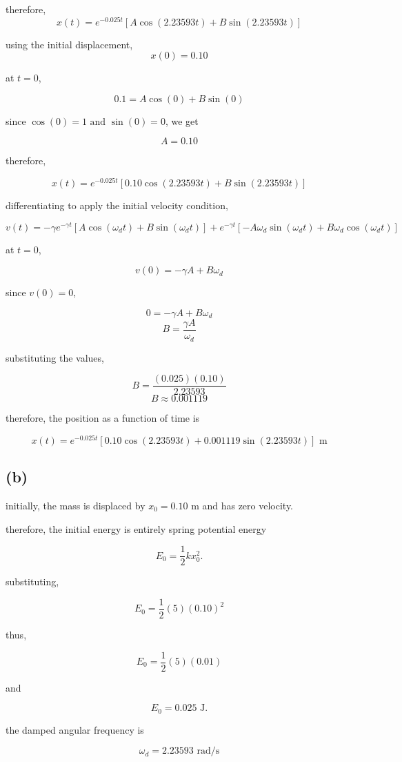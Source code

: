\documentclass{article}
\begin{document}
therefore,
\[
x(t)=e^{-0.025t}\left[A\cos(2.23593t)+B\sin(2.23593t)\right]
\]

using the initial displacement,
\[
x(0)=0.10
\]

at $t=0$,

\[
0.1=A\cos(0)+B\sin(0)
\]

since $\cos(0)=1 \text{ and } \sin(0)=0$, we get

\[
A=0.10
\]

therefore,

\[
x(t) = e^{-0.025t}\left[0.10\cos(2.23593t)+B\sin(2.23593t)\right]
\]

differentiating to apply the initial velocity condition,

\[
v(t)=-\gamma e^{-\gamma t}\left[A\cos(\omega_dt)+B\sin(\omega_dt)\right]+e^{-\gamma t}\left[-A\omega_d\sin(\omega_dt)+B\omega_d\cos(\omega_dt)\right]
\]

at $t=0$,

\[
v(0)=-\gamma A+B\omega_d
\]

since $v(0)=0$,

\[
0=-\gamma A+B\omega_d
\]
\[
B=\frac{\gamma A}{\omega_d}
\]

substituting the values,

\[
B=\frac{(0.025)(0.10)}{2.23593}
\]
\[
B\approx0.001119
\]

therefore, the position as a function of time is

\[
\boxed{
x(t)=e^{-0.025t}\left[0.10\cos(2.23593t)+0.001119\sin(2.23593t)\right]\text{ m}}
\]

\subsection*{(b)}

initially, the mass is displaced by $x_0=0.10\text{ m}$ and has zero velocity.

therefore, the initial energy is entirely spring potential energy

\[
E_0=\frac{1}{2}kx_0^2.
\]

substituting,

\[
E_0=\frac{1}{2}(5)(0.10)^2
\]

thus,

\[
E_0=\frac{1}{2}(5)(0.01)
\]

and

\[
E_0=0.025\text{ J}.
\]

the damped angular frequency is

\[
\omega_d=2.23593\text{ rad/s}
\]
\end{document}
